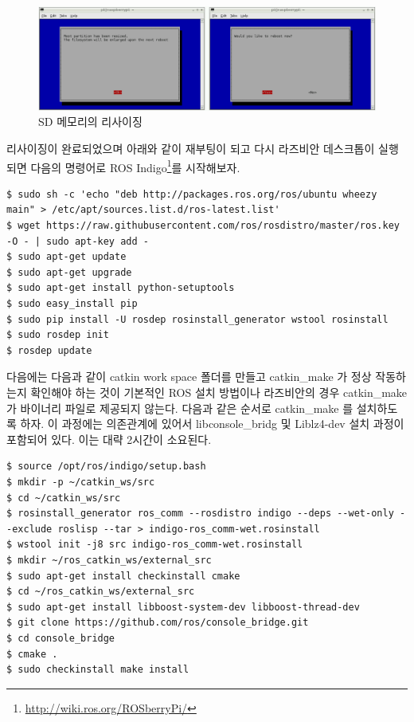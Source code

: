 \begin{figure}[h]
\centering\includegraphics[width=\columnwidth]{pictures/chapter3/raspberrypi_expand_filesystem2.png}
\caption{SD 메모리의 리사이징}
\label{fig:raspberrypi_expand_filesystem2}
\end{figure}

리사이징이 완료되었으며 아래와 같이 재부팅이 되고 다시 라즈비안 데스크톱이 실행되면 다음의 명령어로 ROS Indigo\footnote{\url{http://wiki.ros.org/ROSberryPi/}}를 시작해보자.

\begin{lstlisting}[language=ROS]
$ sudo sh -c 'echo "deb http://packages.ros.org/ros/ubuntu wheezy main" > /etc/apt/sources.list.d/ros-latest.list'
$ wget https://raw.githubusercontent.com/ros/rosdistro/master/ros.key -O - | sudo apt-key add -
$ sudo apt-get update
$ sudo apt-get upgrade
$ sudo apt-get install python-setuptools
$ sudo easy_install pip
$ sudo pip install -U rosdep rosinstall_generator wstool rosinstall
$ sudo rosdep init
$ rosdep update
\end{lstlisting}

다음에는 다음과 같이 catkin work space 폴더를 만들고 catkin\_make 가 정상 작동하는지 확인해야 하는 것이 기본적인 ROS 설치 방법이나 라즈비안의 경우 catkin\_make가 바이너리 파일로 제공되지 않는다. 다음과 같은 순서로 catkin\_make 를 설치하도록 하자. 이 과정에는 의존관계에 있어서 libconsole\_bridg 및 Liblz4-dev 설치 과정이 포함되어 있다. 이는 대략 2시간이 소요된다.

\begin{lstlisting}[language=ROS]
$ source /opt/ros/indigo/setup.bash
$ mkdir -p ~/catkin_ws/src
$ cd ~/catkin_ws/src
$ rosinstall_generator ros_comm --rosdistro indigo --deps --wet-only --exclude roslisp --tar > indigo-ros_comm-wet.rosinstall
$ wstool init -j8 src indigo-ros_comm-wet.rosinstall
$ mkdir ~/ros_catkin_ws/external_src
$ sudo apt-get install checkinstall cmake
$ cd ~/ros_catkin_ws/external_src
$ sudo apt-get install libboost-system-dev libboost-thread-dev
$ git clone https://github.com/ros/console_bridge.git
$ cd console_bridge
$ cmake .
$ sudo checkinstall make install
\end{lstlisting}

